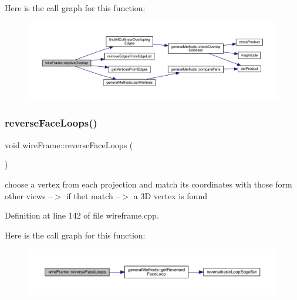 Here is the call graph for this function\+:
\nopagebreak
\begin{figure}[H]
\begin{center}
\leavevmode
\includegraphics[width=350pt]{classwire_frame_adaca5f3e21a232ad7eef8135b2e470dd_cgraph}
\end{center}
\end{figure}
\mbox{\label{classwire_frame_a4a14c6a4043acfaba2a7122daaf925e6}} 
\subsubsection{\texorpdfstring{reverse\+Face\+Loops()}{reverseFaceLoops()}}
{\footnotesize\ttfamily void wire\+Frame\+::reverse\+Face\+Loops (\begin{DoxyParamCaption}{ }\end{DoxyParamCaption})}

choose a vertex from each projection and match its coordinates with those form other views --$>$ if thet match --$>$ a 3D vertex is found 

Definition at line 142 of file wireframe.\+cpp.

Here is the call graph for this function\+:
\nopagebreak
\begin{figure}[H]
\begin{center}
\leavevmode
\includegraphics[width=350pt]{classwire_frame_a4a14c6a4043acfaba2a7122daaf925e6_cgraph}
\end{center}
\end{figure}
\mbox{\label{classwire_frame_a14535da73afb6388a89fb3c645ba5d18}} 
